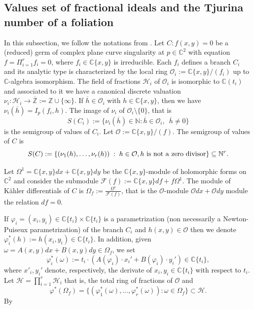 \documentclass[11pt]{amsart}
\newcommand{\C}{\mathbb{C}}
\newcommand{\F}{\mathcal{F}}
\begin{document}
\subsection{Values set of fractional ideals and the Tjurina number of a foliation}
In this subsection, we follow the notations from \cite{A-H}. Let $C:f(x,y)=0$ be a (reduced) germ of complex plane curve singularity at $p\in\C^2$ with equation $f=\Pi_{i=1}^{r}f_i=0$, where $f_i\in\C\{x,y\}$ is irreducible. Each $f_i$ defines a branch $C_i$ and its analytic type is characterized by the local ring $\mathcal{O}_i:=\C\{x,y\}/(f_i)$ up to $\C$-algebra isomorphism. The field of fractions $\mathcal{H}_i$ of $\mathcal{O}_i$ is isomorphic to $\C(t_i)$ and associated to it we have a canonical discrete valuation $\nu_i:\mathcal{H}_i\to\overline{\mathbb{Z}}:=\mathbb{Z}\cup\{\infty\}$. If $\overline{h}\in\mathcal{O}_i$ with $h\in\C\{x,y\}$, then we have $\nu_i(\overline{h})=I_p(f_i,h)$. The image of $\nu_i$ of $\mathcal{O}_i\setminus\{0\}$, that is
\begin{equation*}
S(C_i):=\{\nu_i(\overline{h})\in\mathbb{N}:\overline{h}\in\mathcal{O}_i,\,\,\,\overline{h}\neq 0\}
\end{equation*}
is the semigroup of values of $C_i$. Let  $\mathcal{O}:=\C\{x,y\}/(f)$. The semigroup of values  of $C$ is
\[
S(C):=\{(\nu_1(h),\ldots, \nu_r(h))\;:\; h\in \mathcal{O},\hbox{\rm $h$ is not a zero divisor}\}\subseteq \mathbb N^r.
\]
\par Let $\Omega^1=\C\{x,y\}dx+\C\{x,y\}dy$ be the $\C\{x,y\}$-module of holomorphic forms on $\C^2$ and consider the submodule $\F(f):=\C\{x,y\}df+f\Omega^1$. The module of K\"ahler differentials of $C$ is $\Omega_f:=\frac{\Omega^1}{\F(f)}$, that is the $\mathcal{O}$-module $\mathcal{O}dx+\mathcal{O}dy$ module the relation $df=0$. 
\par If $\varphi_i=(x_i,y_i)\in\C\{t_i\}\times\C\{t_i\}$ is a parametrization (non necessarily a Newton-Puiseux parametrization) of the branch $C_i$ and $h(x,y)\in\mathcal{O}$ then we denote $\varphi^{*}_i(h):=h(x_i,y_i)\in\C\{t_i\}$. In addition, given $\omega=A(x,y)dx+B(x,y) dy\in\Omega_f$, we set 
\[\varphi^{*}_i(\omega):=t_i\cdot (A(\varphi_i)\cdot x_i'+B(\varphi_i)\cdot y_i')\in\C\{t_i\},\]
where $x'_i,y_i'$ denote, respectively, the derivate of $x_i,y_i\in\C\{t_i\}$ with respect to $t_i$. Let $\mathcal{H}=\prod_{i=1}^r \mathcal{H}_i$ that is, the total ring of fractions of $\mathcal{O}$ and 
\[\varphi^{*}(\Omega_f)=\{(\varphi_1^{*}(\omega),\ldots,\varphi_r^{*}(\omega)):\omega\in\Omega_f\}\subset\mathcal{H}.\]
By \cite[Theorem 3.1]{Bayer}
\end{document}
